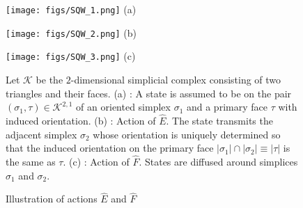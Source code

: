 \documentclass[a4paper,12pt]{article}
\numberwithin{equation}{section}
\begin{document}
\begin{figure}[htbp]\em
\begin{minipage}{0.32\hsize}
\centering
\texttt{[image: figs/SQW\_1.png]}
(a)
\end{minipage}
\begin{minipage}{0.32\hsize}
\centering
\texttt{[image: figs/SQW\_2.png]}
(b)
\end{minipage}
\begin{minipage}{0.32\hsize}
\centering
\texttt{[image: figs/SQW\_3.png]}
(c)
\end{minipage}
\caption{Illustration of actions $\hat E$ and $\hat F$}
\label{fig-SQW}
Let $\mathcal{K}$ be the $2$-dimensional simplicial complex consisting of two triangles and their faces.
(a) : A state is assumed to be on the pair $(\sigma_1, \tau)\in \mathcal{K}^{2,1}$ of an oriented simplex $\sigma_1$ and a primary face $\tau$ with induced orientation.
(b) : Action of $\hat E$. 
The state transmits the adjacent simplex $\sigma_2$ whose orientation is uniquely determined so that the induced orientation on the primary face $|\sigma_1|\cap |\sigma_2|\equiv |\tau|$ is the same as $\tau$. 
(c) : Action of $\hat F$. 
States are diffused around simplices $\sigma_1$ and $\sigma_2$.
\end{figure}
\end{document}

